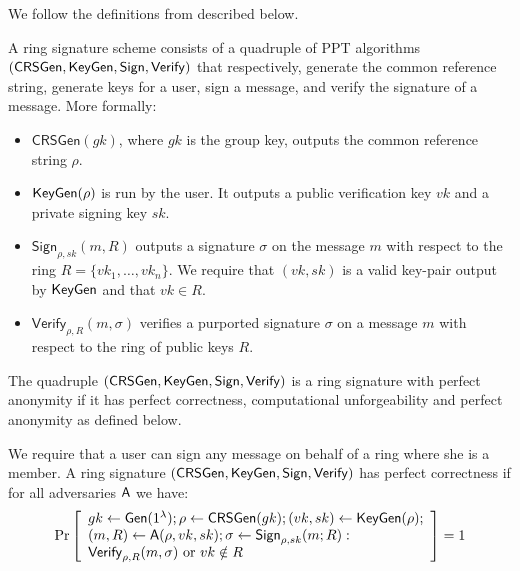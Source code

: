 We follow the definitions from \cite{ICALP:ChaGroSah07} described below.

\begin{definition}
A ring signature scheme consists of a quadruple of
PPT algorithms $(\mathsf{CRSGen}, \mathsf{KeyGen}, \mathsf{Sign}, \mathsf{Verify})$ that respectively, generate the common
reference string, generate keys for a user, sign a message, and verify the signature of a
message. More formally:
\begin{itemize}
\item $\mathsf{CRSGen}(gk)$, where $gk$ is the group key, outputs the common reference
string $\rho$.
\item $\mathsf{KeyGen}(\rho)$ is run by the user. It outputs a public verification key $vk$ and a private
signing key $sk$.
\item $\mathsf{Sign}_{\rho,sk}(m, R)$ outputs a signature $\sigma$ on the message $m$ with respect to the ring
$R = \{vk_1,\ldots,vk_n\}$. We require that $(vk, sk)$ is a valid key-pair output by $\mathsf{KeyGen}$
and that $vk \in R$.
\item $\mathsf{Verify}_{\rho,R}(m, \sigma)$ verifies a purported signature $\sigma$ on a message $m$ with respect to
the ring of public keys $R$.
\end{itemize}
The quadruple $(\mathsf{CRSGen}, \mathsf{KeyGen}, \mathsf{Sign}, \mathsf{Verify})$ is a ring signature with perfect
anonymity if it has perfect correctness, computational unforgeability and perfect
anonymity as defined below.
\end{definition}

\begin{definition}
We require that a user can sign any message on behalf of a ring where she is a member. A ring signature $(\mathsf{CRSGen},\allowbreak \mathsf{KeyGen}, \mathsf{Sign}, \mathsf{Verify})$
has perfect correctness if for all adversaries $\mathsf{A}$ we have:
$$
\Pr\left[\begin{array}{l}
gk\gets\mathsf{Gen}(1^\lambda);\rho\gets\mathsf{CRSGen}(gk);(vk,sk)\gets\mathsf{KeyGen}(\rho);\\
(m,R)\gets\mathsf{A}(\rho,vk,sk);\sigma\gets\mathsf{Sign}_{\rho,sk}(m;R):\\
\mathsf{Verify}_{\rho,R}(m,\sigma)\text{ or }vk\notin R
\end{array}\right]=1
$$
\end{definition}

